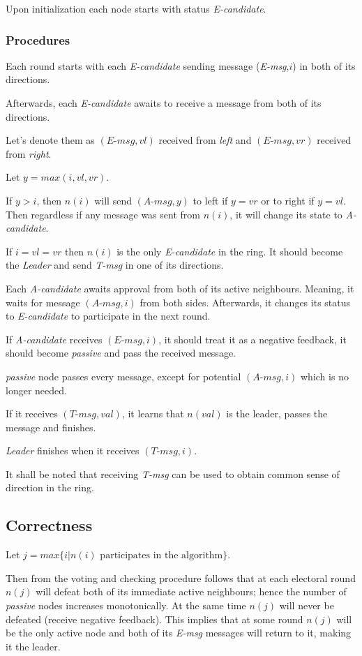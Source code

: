 \documentclass{article}
\begin{document}
Upon initialization each node starts with status \textit{E-candidate}.
\subsubsection*{Procedures}
Each round starts with each \textit{E-candidate} sending message (\textit{E-msg},$i$) in both of its directions.

Afterwards, each \textit{E-candidate} awaits to receive a message from both of its directions.

Let's denote them as $(\textit{E-msg},vl)$ received from \textit{left} and $(\textit{E-msg},vr)$ received from \textit{right}.

Let $y=max(i,vl,vr)$.

If $y>i$, then $n(i)$ will send $(\textit{A-msg},y)$ to left if $y=vr$ or to right if $y=vl$.
Then regardless if any message was sent from $n(i)$, it will change its state to \textit{A-candidate}.

If $i=vl=vr$ then $n(i)$ is the only \textit{E-candidate} in the ring. It should become the \textit{Leader} and send \textit{T-msg} in one of its directions.

Each \textit{A-candidate} awaits approval from both of its active neighbours. Meaning, it waits for message $(\textit{A-msg},i)$ from both sides. Afterwards, it changes its status to \textit{E-candidate} to participate in the next round.

If \textit{A-candidate} receives $(\textit{E-msg},i)$, it should treat it as a negative feedback, it should become \textit{passive} and pass the received message.

\textit{passive} node passes every message, except for potential $(\textit{A-msg},i)$ which is no longer needed.

If it receives $(\textit{T-msg},val)$, it learns that $n(val)$ is the leader, passes the message and finishes.

\textit{Leader} finishes when it receives $(\textit{T-msg},i)$.

It shall be noted that receiving \textit{T-msg} can be used to obtain common sense of direction in the ring.
\subsection*{Correctness}
Let $j=max\{i | n(i) \text{ participates in the algorithm}\}$. 

Then from the voting and checking procedure follows that at each electoral round $n(j)$ will defeat both of its immediate active neighbours; hence the number of \textit{passive} nodes increases monotonically. At the same time $n(j)$ will never be defeated (receive negative feedback). This implies that at some round $n(j)$ will be the only active node and both of its \textit{E-msg} messages will return to it, making it the leader.
\end{document}
